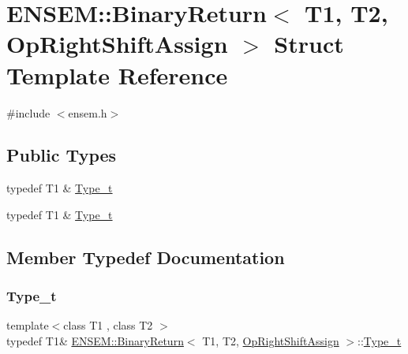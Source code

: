 \hypertarget{structENSEM_1_1BinaryReturn_3_01T1_00_01T2_00_01OpRightShiftAssign_01_4}{}\section{E\+N\+S\+EM\+:\+:Binary\+Return$<$ T1, T2, Op\+Right\+Shift\+Assign $>$ Struct Template Reference}
\label{structENSEM_1_1BinaryReturn_3_01T1_00_01T2_00_01OpRightShiftAssign_01_4}


{\ttfamily \#include $<$ensem.\+h$>$}

\subsection*{Public Types}
\begin{DoxyCompactItemize}
\item 
typedef T1 \& \mbox{\hyperlink{structENSEM_1_1BinaryReturn_3_01T1_00_01T2_00_01OpRightShiftAssign_01_4_a26258e35d38645434ce665a2ece52c32}{Type\+\_\+t}}
\item 
typedef T1 \& \mbox{\hyperlink{structENSEM_1_1BinaryReturn_3_01T1_00_01T2_00_01OpRightShiftAssign_01_4_a26258e35d38645434ce665a2ece52c32}{Type\+\_\+t}}
\end{DoxyCompactItemize}


\subsection{Member Typedef Documentation}
\mbox{\label{structENSEM_1_1BinaryReturn_3_01T1_00_01T2_00_01OpRightShiftAssign_01_4_a26258e35d38645434ce665a2ece52c32}} 
\subsubsection{\texorpdfstring{Type\_t}{Type\_t}\hspace{0.1cm}{\footnotesize\ttfamily [1/2]}}
{\footnotesize\ttfamily template$<$class T1 , class T2 $>$ \\
typedef T1\& \mbox{\hyperlink{structENSEM_1_1BinaryReturn}{E\+N\+S\+E\+M\+::\+Binary\+Return}}$<$ T1, T2, \mbox{\hyperlink{structENSEM_1_1OpRightShiftAssign}{Op\+Right\+Shift\+Assign}} $>$\+::\mbox{\hyperlink{structENSEM_1_1BinaryReturn_3_01T1_00_01T2_00_01OpRightShiftAssign_01_4_a26258e35d38645434ce665a2ece52c32}{Type\+\_\+t}}}


